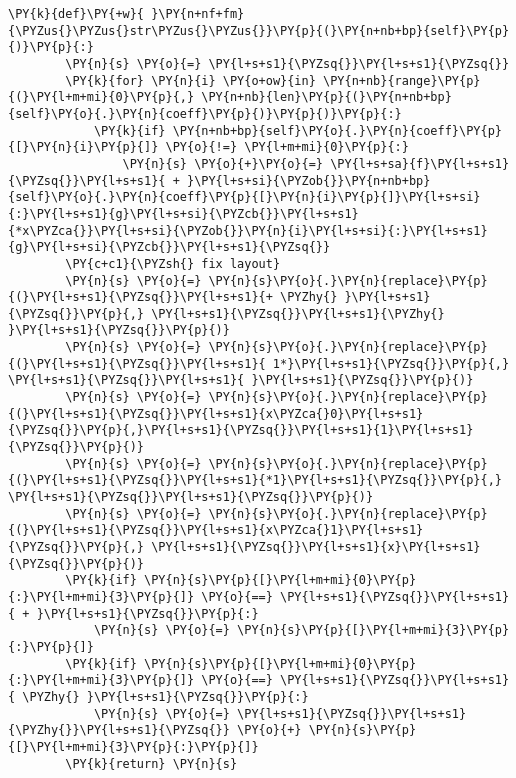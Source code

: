 \begin{example}
\begin{tcolorbox}[breakable, size=fbox, boxrule=1pt, pad at break*=1mm,colback=cellbackground, colframe=cellborder]
\begin{Verbatim}[commandchars=\\\{\}]
    \PY{k}{def}\PY{+w}{ }\PY{n+nf+fm}{\PYZus{}\PYZus{}str\PYZus{}\PYZus{}}\PY{p}{(}\PY{n+nb+bp}{self}\PY{p}{)}\PY{p}{:}
        \PY{n}{s} \PY{o}{=} \PY{l+s+s1}{\PYZsq{}}\PY{l+s+s1}{\PYZsq{}}
        \PY{k}{for} \PY{n}{i} \PY{o+ow}{in} \PY{n+nb}{range}\PY{p}{(}\PY{l+m+mi}{0}\PY{p}{,} \PY{n+nb}{len}\PY{p}{(}\PY{n+nb+bp}{self}\PY{o}{.}\PY{n}{coeff}\PY{p}{)}\PY{p}{)}\PY{p}{:}
            \PY{k}{if} \PY{n+nb+bp}{self}\PY{o}{.}\PY{n}{coeff}\PY{p}{[}\PY{n}{i}\PY{p}{]} \PY{o}{!=} \PY{l+m+mi}{0}\PY{p}{:}
                \PY{n}{s} \PY{o}{+}\PY{o}{=} \PY{l+s+sa}{f}\PY{l+s+s1}{\PYZsq{}}\PY{l+s+s1}{ + }\PY{l+s+si}{\PYZob{}}\PY{n+nb+bp}{self}\PY{o}{.}\PY{n}{coeff}\PY{p}{[}\PY{n}{i}\PY{p}{]}\PY{l+s+si}{:}\PY{l+s+s1}{g}\PY{l+s+si}{\PYZcb{}}\PY{l+s+s1}{*x\PYZca{}}\PY{l+s+si}{\PYZob{}}\PY{n}{i}\PY{l+s+si}{:}\PY{l+s+s1}{g}\PY{l+s+si}{\PYZcb{}}\PY{l+s+s1}{\PYZsq{}}
        \PY{c+c1}{\PYZsh{} fix layout}
        \PY{n}{s} \PY{o}{=} \PY{n}{s}\PY{o}{.}\PY{n}{replace}\PY{p}{(}\PY{l+s+s1}{\PYZsq{}}\PY{l+s+s1}{+ \PYZhy{} }\PY{l+s+s1}{\PYZsq{}}\PY{p}{,} \PY{l+s+s1}{\PYZsq{}}\PY{l+s+s1}{\PYZhy{} }\PY{l+s+s1}{\PYZsq{}}\PY{p}{)}
        \PY{n}{s} \PY{o}{=} \PY{n}{s}\PY{o}{.}\PY{n}{replace}\PY{p}{(}\PY{l+s+s1}{\PYZsq{}}\PY{l+s+s1}{ 1*}\PY{l+s+s1}{\PYZsq{}}\PY{p}{,} \PY{l+s+s1}{\PYZsq{}}\PY{l+s+s1}{ }\PY{l+s+s1}{\PYZsq{}}\PY{p}{)}
        \PY{n}{s} \PY{o}{=} \PY{n}{s}\PY{o}{.}\PY{n}{replace}\PY{p}{(}\PY{l+s+s1}{\PYZsq{}}\PY{l+s+s1}{x\PYZca{}0}\PY{l+s+s1}{\PYZsq{}}\PY{p}{,}\PY{l+s+s1}{\PYZsq{}}\PY{l+s+s1}{1}\PY{l+s+s1}{\PYZsq{}}\PY{p}{)}
        \PY{n}{s} \PY{o}{=} \PY{n}{s}\PY{o}{.}\PY{n}{replace}\PY{p}{(}\PY{l+s+s1}{\PYZsq{}}\PY{l+s+s1}{*1}\PY{l+s+s1}{\PYZsq{}}\PY{p}{,} \PY{l+s+s1}{\PYZsq{}}\PY{l+s+s1}{\PYZsq{}}\PY{p}{)}
        \PY{n}{s} \PY{o}{=} \PY{n}{s}\PY{o}{.}\PY{n}{replace}\PY{p}{(}\PY{l+s+s1}{\PYZsq{}}\PY{l+s+s1}{x\PYZca{}1}\PY{l+s+s1}{\PYZsq{}}\PY{p}{,} \PY{l+s+s1}{\PYZsq{}}\PY{l+s+s1}{x}\PY{l+s+s1}{\PYZsq{}}\PY{p}{)}
        \PY{k}{if} \PY{n}{s}\PY{p}{[}\PY{l+m+mi}{0}\PY{p}{:}\PY{l+m+mi}{3}\PY{p}{]} \PY{o}{==} \PY{l+s+s1}{\PYZsq{}}\PY{l+s+s1}{ + }\PY{l+s+s1}{\PYZsq{}}\PY{p}{:}
            \PY{n}{s} \PY{o}{=} \PY{n}{s}\PY{p}{[}\PY{l+m+mi}{3}\PY{p}{:}\PY{p}{]}
        \PY{k}{if} \PY{n}{s}\PY{p}{[}\PY{l+m+mi}{0}\PY{p}{:}\PY{l+m+mi}{3}\PY{p}{]} \PY{o}{==} \PY{l+s+s1}{\PYZsq{}}\PY{l+s+s1}{ \PYZhy{} }\PY{l+s+s1}{\PYZsq{}}\PY{p}{:}
            \PY{n}{s} \PY{o}{=} \PY{l+s+s1}{\PYZsq{}}\PY{l+s+s1}{\PYZhy{}}\PY{l+s+s1}{\PYZsq{}} \PY{o}{+} \PY{n}{s}\PY{p}{[}\PY{l+m+mi}{3}\PY{p}{:}\PY{p}{]}
        \PY{k}{return} \PY{n}{s}
\end{Verbatim}
\end{tcolorbox}


\end{example}
